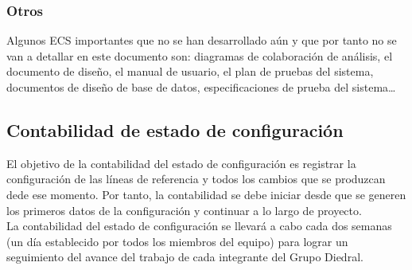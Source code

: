 \documentclass[11pt, a4paper, twoside, titlepage]{article}
\begin{document}
			\subsubsection{Otros}
				Algunos ECS importantes que no se han desarrollado aún y que por tanto no se van a detallar en este documento son: diagramas de colaboración de análisis, el documento de diseño, el manual de usuario, el plan de pruebas del sistema, documentos de diseño de base de datos, especificaciones de prueba del sistema\ldots

		\subsection{Contabilidad de estado de configuración} %
			El objetivo de la contabilidad del estado de configuración es registrar la configuración de las líneas de referencia y todos los cambios que se produzcan dede ese momento. Por tanto, la contabilidad se debe iniciar desde que se generen los primeros datos de la configuración y continuar a lo largo de proyecto. \\			

			La contabilidad del estado de configuración se llevará a cabo cada dos semanas (un día establecido por todos los miembros del equipo) para lograr un seguimiento del avance del trabajo de cada integrante del Grupo Diedral.
			
\end{document}
